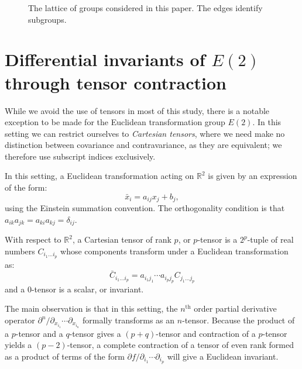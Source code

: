 \documentclass[review,onefignum,onetabnum]{siamonline190516}
\begin{document}
{\begin{figure}
\begin{center}
\end{center}
\caption{The lattice of groups considered in this paper. The edges identify subgroups.}
\end{figure}



\section{Differential invariants of $E(2)$ through tensor contraction}
While we avoid the use of tensors in most of this study, there is a notable exception to be made for the Euclidean transformation group $E(2)$. In this setting we can restrict ourselves to \emph{Cartesian tensors}, where we need make no distinction between covariance and contravariance, as they are equivalent; we therefore use subscript indices exclusively.

In this setting, a Euclidean transformation acting on $\mathbb{R}^2$ is given
by an expression of the form:
\begin{equation*}
  \bar{x}_i = a_{ij}x_j + b_j,
\end{equation*}
using the Einstein summation convention. The orthogonality condition is that $a_{ik}a_{jk} = a_{ki}a_{kj} = \delta_{ij}$.

With respect to $\mathbb{R}^2$, a Cartesian tensor of rank $p$, or $p$-tensor is a $2^p$-tuple of real numbers $C_{i_1\ldots i_p}$ whose components transform under a Euclidean transformation as:
\begin{equation*}
  \bar{C}_{i_1\ldots i_p} = a_{i_1j_1}\cdots a_{i_pj_p} C_{j_1\ldots j_p}
\end{equation*}
and a $0$-tensor is a scalar, or invariant. 

The main observation is that in this setting, the $n^\text{th}$ order partial derivative operator $\partial^n / \partial_{x_{i_1}} \cdots \partial_{x_{i_n}}$ formally transforms as an $n$-tensor.  Because the product of a $p$-tensor and a $q$-tensor gives a $(p+q)$-tensor and contraction of a $p$-tensor yields a $(p-2)$-tensor, a complete contraction of a tensor of even rank formed as a product of terms of the form $\partial f / \partial_{i_1} \cdots \partial_{i_p}$ will give a Euclidean invariant.

}
\end{document}
